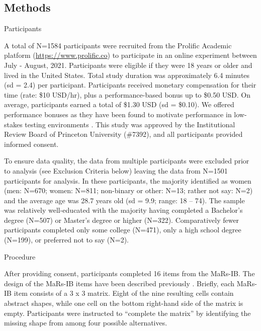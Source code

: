 \documentclass[a4paper,man,natbib]{apa6}
\makeatletter
\renewcommand{\subsubsection}{\@startsection{subsubsection}{3}
  {\z@}%
  {\b@level@two@skip}{\e@level@two@skip}%
  {\normalfont\normalsize\bfseries}}
\makeatother
\begin{document}
\subsection{Methods}

\subsubsection{Participants} 

A total of N=1584 participants were recruited from the Prolific Academic platform (\url{https://www.prolific.co}) to participate in an online experiment between July - August, 2021. Participants were eligible if they were 18 years or older and lived in the United States. Total study duration was approximately 6.4 minutes (sd = 2.4) per participant. Participants received monetary compensation for their time (rate: \$10 USD/hr), plus a performance-based bonus up to \$0.50 USD. On average, participants earned a total of \$1.30 USD (sd = \$0.10). We offered performance bonuses as they have been found to motivate performance in low-stakes testing environments \citep{duckworth2011role, gignac2018moderate}. This study was approved by the Institutional Review Board of Princeton University (\#7392), and all participants provided informed consent.

To ensure data quality, the data from multiple participants were excluded prior to analysis (see Exclusion Criteria below) leaving the data from N=1501 participants for analysis. In these participants, the majority identified as women (men: N=670; women: N=811; non-binary or other: N=13; rather not say: N=2) and the average age was 28.7 years old (sd = 9.9; range: 18 -- 74). The sample was relatively well-educated with the majority having completed a Bachelor's degree (N=507) or Master's degree or higher (N=322). Comparatively fewer participants completed only some college (N=471), only a high school degree (N=199), or preferred not to say (N=2). 

\subsubsection{Procedure}

After providing consent, participants completed 16 items from the MaRs-IB. The design of the MaRs-IB items have been described previously \citep{chierchia2019matrix}. Briefly, each MaRs-IB item consists of a 3 x 3 matrix. Eight of the nine resulting cells contain abstract shapes, while one cell on the bottom right-hand side of the matrix is empty. Participants were instructed to ``complete the matrix'' by identifying the missing shape from among four possible alternatives. 
\end{document}

